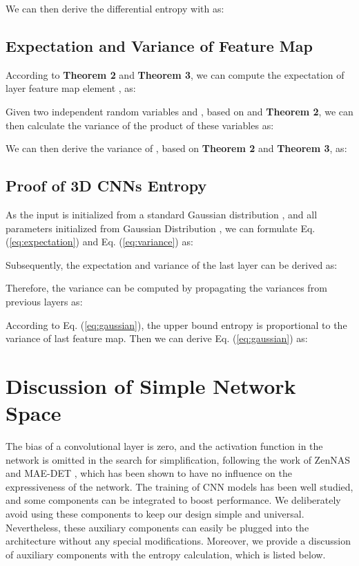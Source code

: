 \documentclass{article} \usepackage{iclr2023_conference,times}
\begin{document}
We can then derive the differential entropy with  as:



\subsection{Expectation and Variance of Feature Map }
\label{ssec:proof variance}

According to \textbf{Theorem 2} and \textbf{Theorem 3}, we can compute the expectation of  layer feature map element , as:



Given two independent random variables  and , based on  and \textbf{Theorem 2}, we can then calculate the variance of the product of these variables as:

We can then derive the variance of , based on \textbf{Theorem 2} and \textbf{Theorem 3}, as:



\subsection{Proof of 3D CNNs Entropy}
\label{ssec:proof 3d cnn}




As the input  is initialized from a standard Gaussian distribution , and all parameters initialized from Gaussian Distribution  , we can formulate Eq. (\ref{eq:expectation}) and Eq. (\ref{eq:variance}) as:

Subsequently, the expectation  and variance  of the last layer can be derived as:

Therefore, the variance can be computed by propagating the variances from previous layers as:

According to Eq. (\ref{eq:gaussian}), the upper bound entropy is proportional to the variance of last feature map. Then we can derive Eq. (\ref{eq:gaussian}) as:



\newpage
\section{Discussion of Simple Network Space}
\label{sec:simple network}

The bias of a convolutional layer is zero, and the activation function in the network is omitted in the search for simplification,  following the work of ZenNAS \citep{lin2021zen} and MAE-DET \citep{sun2022mae}, which has been shown to have no influence on the expressiveness of the network.    
The training of CNN models has been well studied, and some components can be integrated to boost performance. We deliberately avoid using these components to keep our design simple and universal. Nevertheless, these auxiliary components can easily be plugged into the architecture without any special modifications.
Moreover, we provide a discussion of auxiliary components with the entropy calculation, which is listed below.
\end{document}
